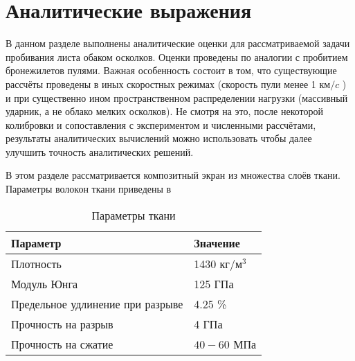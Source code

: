 \chapter{Аналитические выражения}\label{ch:equations}
В данном разделе выполнены аналитические оценки для рассматриваемой задачи пробивания листа обаком осколков.
Оценки проведены по аналогии с пробитием бронежилетов пулями.
Важная особенность состоит в том, что существующие рассчёты проведены в иных скоростных режимах (скорость пули менее
1 $км/c$ ) и при существенно ином пространственном распределении нагрузки (массивный ударник, а не облако мелких
осколков).
Не смотря на это, после некоторой колибровки и сопоставления с экспериментом и численными рассчётами, результаты
аналитических вычислений можно использовать чтобы далее улучшить точность аналитических решений.

В этом разделе рассматривается композитный экран из множества слоёв ткани.
Параметры волокон ткани приведены в 

\begin{table}[h]
    \centering
    \begin{tabular}{|l|l|}
        \hline
        Параметр & Значение      \\ \hline
        Плотность & 1430 $кг/м^3$ \\ \hline
        Модуль Юнга & 125 ГПа       \\ \hline
        Предельное удлинение при разрыве & 4.25 \%       \\ \hline
        Прочность на разрыв & 4 ГПа         \\ \hline
        Прочность на сжатие & $40-60$ МПа     \\ \hline
    \end{tabular}
    \label{tbl:kevlar-params}
    \caption{Параметры ткани}
\end{table}